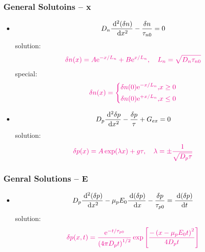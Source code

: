 \documentclass{beamer}
\begin{document}
    \begin{frame} \frametitle{General Solutoins -- x}
        \begin{itemize}
            \item \begin{equation*}
                    D_n \frac{\: \mathrm{d} ^2 (\delta n)}{\: \mathrm{d} x^2} - \frac{\delta n}{\tau_{n0}} = 0
                \end{equation*}
                solution:
                \begin{equation*}
                    \color{magenta}
                    \delta n(x) = A \mathrm{e}^{- x/L_n} + B \mathrm{e}^{x/L_n}, \quad L_n = \sqrt{D_n \tau_{n0}}
                \end{equation*}
                special:
                \begin{equation*}
                    \color{magenta}
                    \delta n(x) = 
                    \left\{
                        \begin{aligned}
                            \delta n(0) \mathrm{e}^{-x / L_n}, &x \ge 0 \\
                            \delta n(0) \mathrm{e}^{+x/L_n}, &x \le 0
                        \end{aligned}
                    \right.
                \end{equation*}

            \item \begin{equation*}
                    D_p \frac{\: \mathrm{d} ^2 \delta p}{\: \mathrm{d} x^2} - \frac{\delta p}{\tau} + G_{ex} = 0
                \end{equation*}
                solution:
                \begin{equation*}
                    \color{magenta}
                    \delta p(x) = A \exp(\lambda x) + g \tau, \quad \lambda = \pm \frac{1}{\sqrt{D_p \tau}} 
                \end{equation*}
        \end{itemize}
    \end{frame}

    \begin{frame} \frametitle{Genral Solutions -- E}
        \begin{itemize}
            \item \begin{equation*}
                    D_p \frac{\: \mathrm{d}^2 (\delta p)}{\: \mathrm{d} x^2} - \mu_p E_0 \frac{\: \mathrm{d} (\delta p)}{\: \mathrm{d} x} - \frac{\delta p}{\tau_{p0}} = \frac{\: \mathrm{d} (\delta p)}{\: \mathrm{d} t}  
                \end{equation*}
                solution:
                \begin{equation*}
                    \color{magenta}
                    \delta p(x, t) = \frac{\mathrm{e}^{-t/\tau_{p0}} }{\left( 4 \pi D_p t \right)^{1/2}} \exp\left[ \frac{-\left(x - \mu_p E_0 t\right)^2}{4 D_p t}  \right]
                \end{equation*}
        \end{itemize}
    \end{frame}
\end{document}

